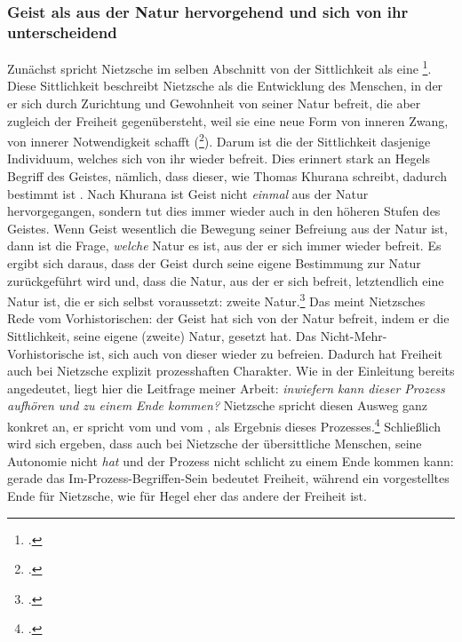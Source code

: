 \documentclass[12pt, a4paper, openany]{report}
\begin{document}
\subsubsection{Geist als aus der Natur hervorgehend und sich von ihr unterscheidend}
Zunächst spricht Nietzsche im selben Abschnitt von der Sittlichkeit als eine \footcite[][293]{nietzsche_jenseits_2014}.
Diese Sittlichkeit beschreibt Nietzsche als die Entwicklung des Menschen, in der er sich durch Zurichtung und Gewohnheit von seiner Natur befreit, die aber zugleich der Freiheit gegenübersteht, weil sie eine neue Form von inneren Zwang, von innerer Notwendigkeit schafft (\footcite[][292]{nietzsche_jenseits_2014}).
Darum ist die  der Sittlichkeit dasjenige Individuum, welches sich von ihr wieder befreit.
Dies erinnert stark an Hegels Begriff des Geistes, nämlich, dass dieser, wie Thomas Khurana schreibt, dadurch bestimmt ist .
Nach Khurana ist Geist nicht \emph{einmal} aus der Natur hervorgegangen, sondern tut dies immer wieder auch in den höheren Stufen des Geistes.
Wenn Geist wesentlich die Bewegung seiner Befreiung aus der Natur ist, dann ist die Frage, \emph{welche} Natur es ist, aus der er sich immer wieder befreit. 
Es ergibt sich daraus, dass der Geist durch seine eigene Bestimmung zur Natur zurückgeführt wird und, dass die Natur, aus der er sich befreit, letztendlich eine Natur ist, die er sich selbst voraussetzt: zweite Natur.\footcite[Vgl.][320]{khurana_freiheit_2017}
Das meint Nietzsches Rede vom Vorhistorischen: 
der Geist hat sich von der Natur befreit, indem er die Sittlichkeit, seine eigene (zweite) Natur, gesetzt hat. 
Das Nicht-Mehr-Vorhistorische ist, sich auch von dieser wieder zu befreien.
Dadurch hat Freiheit auch bei Nietzsche explizit prozesshaften Charakter. 
Wie in der Einleitung bereits angedeutet, liegt hier die Leitfrage meiner Arbeit: \emph{inwiefern kann dieser Prozess aufhören und zu einem Ende kommen?}
Nietzsche spricht diesen Ausweg ganz konkret an, er spricht vom  und vom , als Ergebnis dieses Prozesses.\footcite[][293]{nietzsche_jenseits_2014} 
Schließlich wird sich ergeben, dass auch bei Nietzsche der übersittliche Menschen, seine Autonomie nicht \emph{hat} und der Prozess nicht schlicht zu einem Ende kommen kann:
gerade das Im-Prozess-Begriffen-Sein bedeutet Freiheit, während ein vorgestelltes Ende für Nietzsche, wie für Hegel eher das andere der Freiheit ist.\\
\end{document}
